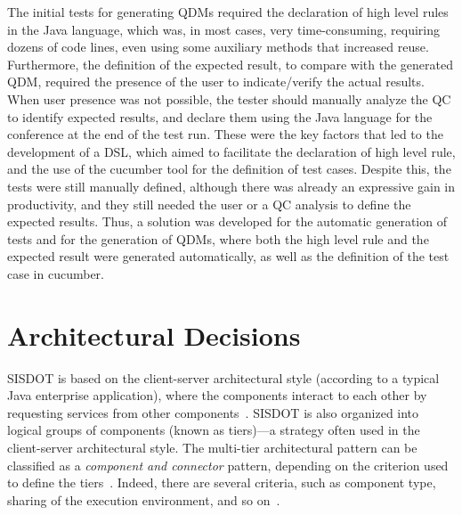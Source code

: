 \documentclass[twocolumn]{bmcart}%
\begin{document}
The initial tests for generating QDMs required the declaration of high level rules in the Java language, which was, in most cases, very time-consuming, requiring dozens of code lines, even using some auxiliary methods that increased reuse. Furthermore, the definition of the expected result, to compare with the generated QDM, required the presence of the user to indicate/verify the actual results. When user presence was not possible, the tester should manually analyze the QC to identify expected results, and declare them using the Java language for the conference at the end of the test run. These were the key factors that led to the development of a DSL, which aimed to facilitate the declaration of high level rule, and the use of the cucumber tool for the definition of test cases. Despite this, the tests were still manually defined, although there was already an expressive gain in productivity, and they still needed the user or a QC analysis to define the expected results. Thus, a solution was developed for the automatic generation of tests and for the generation of QDMs, where both the high level rule and the expected result were generated automatically, as well as the definition of the test case in cucumber.










\section{Architectural Decisions}
\label{sec:architecture} 

SISDOT is based on the client-server architectural style (according to a typical Java enterprise application), where the components interact to each other by requesting services from other components~\cite{clements2011documenting}. SISDOT is also organized into logical groups of components (known as tiers)---a strategy often used in the client-server architectural style. The multi-tier architectural pattern can be classified as a \emph{component and connector} pattern, depending on the criterion used to define the tiers~\cite{bass2013software}. Indeed, there are several criteria, such as component type, sharing of the execution environment, 
and so on~\cite{clements2011documenting}.
\end{document}
